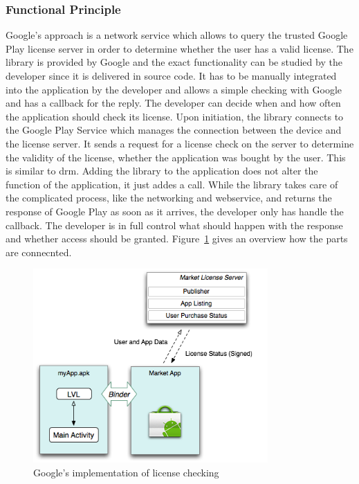 \subsubsection{Functional Principle} \label{section:license-google-functional}
Google's approach is a network service which allows to query the trusted Google Play license server in order to determine whether the user has a valid license.
The library is provided by Google and the exact functionality can be studied by the developer since it is delivered in source code.\cite{munteanLicense}
\newline
It has to be manually integrated into the application by the developer and allows a simple checking with Google and has a callback for the reply.
The developer can decide when and how often the application should check its license.
Upon initiation, the library connects to the Google Play Service which manages the connection between the device and the license server.
It sends a request for a license check on the server to determine the validity of the license, whether the application was bought by the user.
This is similar to \gls{drm}.
Adding the library to the application does not alter the function of the application, it just addes a call.
While the library takes care of the complicated process, like the networking and webservice, and returns the response of Google Play as soon as it arrives, the developer only has handle the callback.
The developer is in full control what should happen with the response and whether access should be granted.
Figure~\ref{fig:lvl} gives an overview how the parts are connecnted. \cite{digipomLvl}\cite{developersLicensingOverview}
\newline
\begin{figure}[h]
    \centering
    \includegraphics[width=0.8\textwidth]{data/lvl.png}
    \caption{Google's implementation of license checking \cite{developersLicensingOverview}}
    \label{fig:lvl}
\end{figure}
